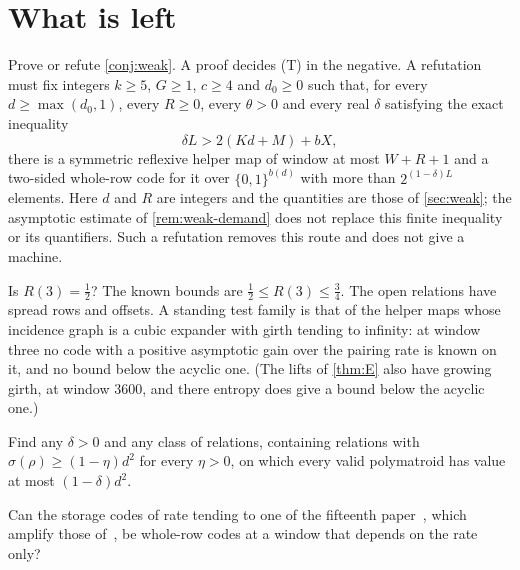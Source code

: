 \section{What is left}\label{sec:open}

\begin{problem}\label{prob:conj}
Prove or refute \cref{conj:weak}. A proof decides \textup{(T)} in the negative. A refutation must fix integers
$k\ge5$, $G\ge1$, $c\ge4$ and $d_0\ge0$ such that, for every $d\ge\max(d_0,1)$, every $R\ge0$, every $\theta>0$
and every real $\delta$ satisfying the exact inequality
\[
 \delta L>2(Kd+M)+bX,
\]
there is a symmetric reflexive helper map of window at most $W+R+1$ and a two-sided whole-row code for it over
$\{0,1\}^{b(d)}$ with more than $2^{(1-\delta)L}$ elements. Here $d$ and $R$ are integers and the quantities are
those of \cref{sec:weak}; the asymptotic estimate of \cref{rem:weak-demand} does not replace this finite inequality
or its quantifiers. Such a refutation removes this route and does not give a machine.
\end{problem}

\begin{problem}\label{prob:three}
Is $R(3)=\tfrac12$? The known bounds are $\tfrac12\le R(3)\le\tfrac34$. The open relations have spread rows and
offsets. A standing test family is that of the helper maps whose incidence graph is a cubic expander with girth
tending to infinity: at window three no code with a positive asymptotic gain over the pairing rate is known on it,
and no bound below the acyclic one. (The lifts of \cref{thm:E} also have growing girth, at window $3600$, and there
entropy does give a bound below the acyclic one.)
\end{problem}

\begin{problem}\label{prob:common}
Find any $\delta>0$ and any class of relations, containing relations with $\sigma(\rho)\ge(1-\eta)d^2$ for every
$\eta>0$, on which every valid polymatroid has value at most $(1-\delta)d^2$.
\end{problem}

\begin{problem}\label{prob:highrate}
Can the storage codes of rate tending to one of the fifteenth paper~\cite{HighRate2026}, which amplify those
of~\cite{StorageCodes2026}, be whole-row codes at a window
that depends on the rate only?
\end{problem}

